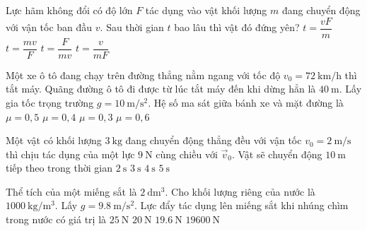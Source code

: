\begin{ex}
	Lực hãm không đổi có độ lớn $F$ tác dụng vào vật khối lượng $m$ đang chuyển động với vận tốc ban đầu $v$. Sau thời gian $t$ bao lâu thì vật đó đứng yên?
	\choice
	{$t=\dfrac{vF}{m}$}
	{\True $t=\dfrac{mv}{F}$}
	{$t=\dfrac{F}{mv}$}
	{$t=\dfrac{v}{mF}$}
	\loigiai{}
\end{ex}
\begin{ex}
	Một xe ô tô đang chạy trên đường thẳng nằm ngang với tốc độ $v_0=\SI{72}{\kilo\meter/\hour}$ thì tắt máy. Quãng đường ô tô đi được từ lúc tắt máy đến khi dừng hẳn là $\SI{40}{\meter}$. Lấy gia tốc trọng trường $g=\SI{10}{\meter/\second^2}$. Hệ số ma sát giữa bánh xe và mặt đường là
	\choice
	{\True $\mu=0,5$}
	{$\mu=0,4$}
	{$\mu=0,3$}
	{$\mu=0,6$}
	\loigiai{}
\end{ex}
\begin{ex}
	Một vật có khối lượng $\SI{3}{\kilogram}$ đang chuyển động thẳng đều với vận tốc $v_0=\SI{2}{\meter/\second}$ thì chịu tác dụng của một lực $\SI{9}{\newton}$ cùng chiều với $\vec{v}_0$. Vật sẽ chuyển động $\SI{10}{\meter}$ tiếp theo trong thời gian	
	\choice
	{\True $\SI{2}{\second}$}
	{$\SI{3}{\second}$}
	{$\SI{4}{\second}$}
	{$\SI{5}{\second}$}
	\loigiai{}
\end{ex}
\begin{ex}
	Thể tích của một miếng sắt là $\SI{2}{\deci\meter^3}$. Cho khối lượng riêng của nước là $\SI{1000}{\kilogram/\meter^3}$. Lấy $g=\SI{9.8}{\meter/\second^2}$. Lực đẩy tác dụng lên miếng sắt khi nhúng chìm trong nước có giá trị là
	\choice
	{$\SI{25}{\newton}$}
	{$\SI{20}{\newton}$}
	{\True $\SI{19.6}{\newton}$}
	{$\SI{19600}{\newton}$}
	\loigiai{}
\end{ex}
